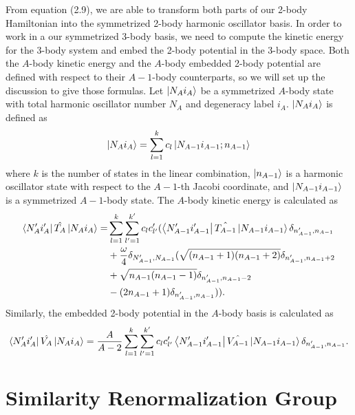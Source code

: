 From equation (2.9), we are able to transform both parts of our 2-body Hamiltonian into the symmetrized 2-body harmonic oscillator basis. In order to work in a our symmetrized 3-body basis, we need to compute the kinetic energy for the 3-body system and embed the 2-body potential in the 3-body space. Both the $A$-body kinetic energy and the $A$-body embedded 2-body potential are defined with respect to their $A-1$-body counterparts, so we will set up the discussion to give those formulas. Let $\ket{N_A i_A}$ be a symmetrized $A$-body state with total harmonic oscillator number $N_A$ and degeneracy label $i_A$. $\ket{N_A i_A}$ is defined as
\begin{equation}
\ket{N_A i_A} = \sum_{l=1}^k c_l \ket{N_{A-1} i_{A-1}; n_{A-1}}
\end{equation}
where $k$ is the number of states in the linear combination, $\ket{n_{A-1}}$ is a harmonic oscillator state with respect to the $A-1$-th Jacobi coordinate, and $\ket{N_{A-1} i_{A-1}}$ is a symmetrized $A-1$-body state. The $A$-body kinetic energy is calculated as
\begin{equation}
\begin{aligned}
\bra{N_A' i_A'}\hat{T_A}\ket{N_A i_A} = & \sum_{l=1}^k \sum_{l'=1}^{k'} c_l c_{l'}' (\bra{N_{A-1}' i_{A-1}'}\hat{T_{A-1}}\ket{N_{A-1} i_{A-1}}\delta_{n_{A-1}',n_{A-1}} \\ 
& + \frac{\omega}{4}\delta_{N_{A-1}',N_{A-1}}(\sqrt{(n_{A-1} + 1)(n_{A-1} + 2)}\delta_{n_{A-1}',n_{A-1} + 2} \\
& + \sqrt{n_{A-1}(n_{A-1} - 1)}\delta_{n_{A-1}',n_{A-1} - 2} \\
& - (2 n_{A-1} + 1)\delta_{n_{A-1}',n_{A-1}})).
\end{aligned}
\end{equation}
Similarly, the embedded 2-body potential in the $A$-body basis is calculated as
\begin{equation}
\bra{N_A' i_A'}\hat{V_A}\ket{N_A i_A} = \frac{A}{A-2} \sum_{l=1}^k \sum_{l'=1}^{k'} c_l c_{l'}' \bra{N_{A-1}' i_{A-1}'}\hat{V_{A-1}}\ket{N_{A-1} i_{A-1}}\delta_{n_{A-1}',n_{A-1}}.
\end{equation}

\section{Similarity Renormalization Group}

